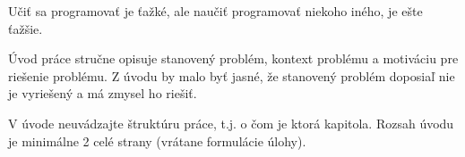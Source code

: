 
\label{ch:introduction}

Učiť sa programovať je ťažké, ale naučiť programovať niekoho iného, je ešte ťažšie.


Úvod práce stručne opisuje stanovený problém, kontext problému a motiváciu pre riešenie problému. Z úvodu by malo byť jasné, že stanovený problém doposiaľ nie je vyriešený a má zmysel ho riešiť.

V úvode neuvádzajte štruktúru práce, t.j. o čom je ktorá kapitola. Rozsah úvodu je minimálne 2 celé strany (vrátane formulácie úlohy).
